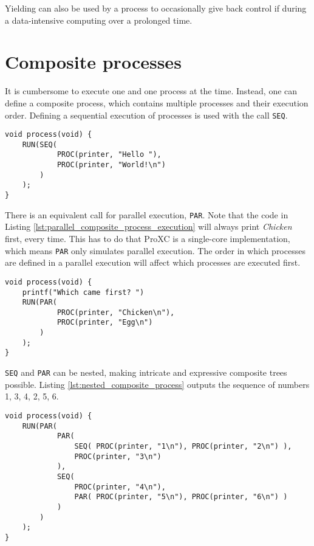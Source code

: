 Yielding can also be used by a process to occasionally give back control if during a data\hyp{}intensive computing over a prolonged time. 

\section*{Composite processes}

It is cumbersome to execute one and one process at the time. Instead, one can define a composite process, which contains multiple processes and their execution order. Defining a sequential execution of processes is used with the call \texttt{SEQ}.  

\begin{lstlisting}[style={CustomC},caption={Sequential composite process execution}]
void process(void) {
    RUN(SEQ(
            PROC(printer, "Hello "),
            PROC(printer, "World!\n")
        )
    );
}
\end{lstlisting}

There is an equivalent call for parallel execution, \texttt{PAR}. Note that the code in Listing \ref{lst:parallel_composite_process_execution} will always print \textit{Chicken} first, every time. This has to do that ProXC is a single\hyp{}core implementation, which means \texttt{PAR} only simulates parallel execution. The order in which processes are defined in a parallel execution will affect which processes are executed first. 

\begin{lstlisting}[style={CustomC},caption={Parallel composite process execution},label={lst:parallel_composite_process_execution}]
void process(void) {
    printf("Which came first? ")
    RUN(PAR(
            PROC(printer, "Chicken\n"),
            PROC(printer, "Egg\n")
        )
    );  
}
\end{lstlisting}

\texttt{SEQ} and \texttt{PAR} can be nested, making intricate and expressive composite trees possible. Listing \ref{lst:nested_composite_process} outputs the sequence of numbers 1, 3, 4, 2, 5, 6.  

\begin{lstlisting}[style={CustomC},caption={Nested composite process},label={lst:nested_composite_process}]
void process(void) {
    RUN(PAR(
            PAR(
                SEQ( PROC(printer, "1\n"), PROC(printer, "2\n") ),
                PROC(printer, "3\n")
            ),
            SEQ(
                PROC(printer, "4\n"),
                PAR( PROC(printer, "5\n"), PROC(printer, "6\n") )
            )
        )
    );  
}
\end{lstlisting}

